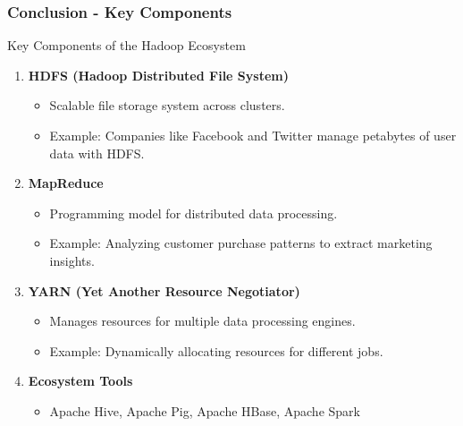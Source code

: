 \documentclass[aspectratio=169]{beamer}
\begin{document}
\begin{frame}[fragile]
    \frametitle{Conclusion - Key Components}
    \begin{block}{Key Components of the Hadoop Ecosystem}
        \begin{enumerate}
            \item \textbf{HDFS (Hadoop Distributed File System)}
            \begin{itemize}
                \item Scalable file storage system across clusters.
                \item Example: Companies like Facebook and Twitter manage petabytes of user data with HDFS.
            \end{itemize}
            
            \item \textbf{MapReduce}
            \begin{itemize}
                \item Programming model for distributed data processing.
                \item Example: Analyzing customer purchase patterns to extract marketing insights.
            \end{itemize}
            
            \item \textbf{YARN (Yet Another Resource Negotiator)}
            \begin{itemize}
                \item Manages resources for multiple data processing engines.
                \item Example: Dynamically allocating resources for different jobs.
            \end{itemize}
            
            \item \textbf{Ecosystem Tools}
            \begin{itemize}
                \item Apache Hive, Apache Pig, Apache HBase, Apache Spark
            \end{itemize}
        \end{enumerate}
    \end{block}
\end{frame}
\end{document}
